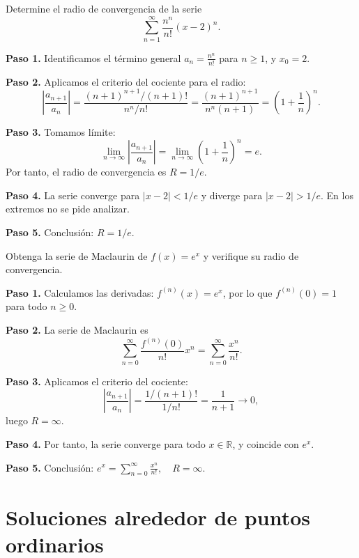 \begin{example}
  Determine el radio de convergencia de la serie
  \[
    \sum_{n=1}^{\infty} \frac{n^n}{n!} (x-2)^n.
  \]
  \begin{myproof}
    \textbf{Paso 1.} Identificamos el término general $a_n = \frac{n^n}{n!}$ para $n\ge 1$, y $x_0=2$.
    
    \textbf{Paso 2.} Aplicamos el criterio del cociente para el radio:
    \[
      \left|\frac{a_{n+1}}{a_n}\right|
      = \frac{(n+1)^{n+1}/(n+1)!}{n^n/n!}
      = \frac{(n+1)^{n+1}}{n^n (n+1)}
      = \left(1+\frac{1}{n}\right)^n.
    \]
    
    \textbf{Paso 3.} Tomamos límite:
    \[
      \lim_{n\to\infty} \left|\frac{a_{n+1}}{a_n}\right|
      = \lim_{n\to\infty} \left(1+\frac{1}{n}\right)^n = e.
    \]
    Por tanto, el radio de convergencia es $R = 1/e$.
    
    \textbf{Paso 4.} La serie converge para $|x-2|<1/e$ y diverge para $|x-2|>1/e$. En los extremos no se pide analizar.
    
    \textbf{Paso 5.} Conclusión: $\boxed{R=1/e}$.
  \end{myproof}
\end{example}

\begin{example}
  Obtenga la serie de Maclaurin de $f(x)=e^x$ y verifique su radio de convergencia.
  \begin{myproof}
    \textbf{Paso 1.} Calculamos las derivadas: $f^{(n)}(x)=e^x$, por lo que $f^{(n)}(0)=1$ para todo $n\ge 0$.
    
    \textbf{Paso 2.} La serie de Maclaurin es
    \[
      \sum_{n=0}^{\infty} \frac{f^{(n)}(0)}{n!} x^n
      = \sum_{n=0}^{\infty} \frac{x^n}{n!}.
    \]
    
    \textbf{Paso 3.} Aplicamos el criterio del cociente:
    \[
      \left|\frac{a_{n+1}}{a_n}\right|
      = \frac{1/(n+1)!}{1/n!} = \frac{1}{n+1} \to 0,
    \]
    luego $R=\infty$.
    
    \textbf{Paso 4.} Por tanto, la serie converge para todo $x\in\mathbb R$, y coincide con $e^x$.
    
    \textbf{Paso 5.} Conclusión: $\boxed{e^x = \sum_{n=0}^{\infty} \frac{x^n}{n!},\quad R=\infty}$.
  \end{myproof}
\end{example}

\section{Soluciones alrededor de puntos ordinarios}

